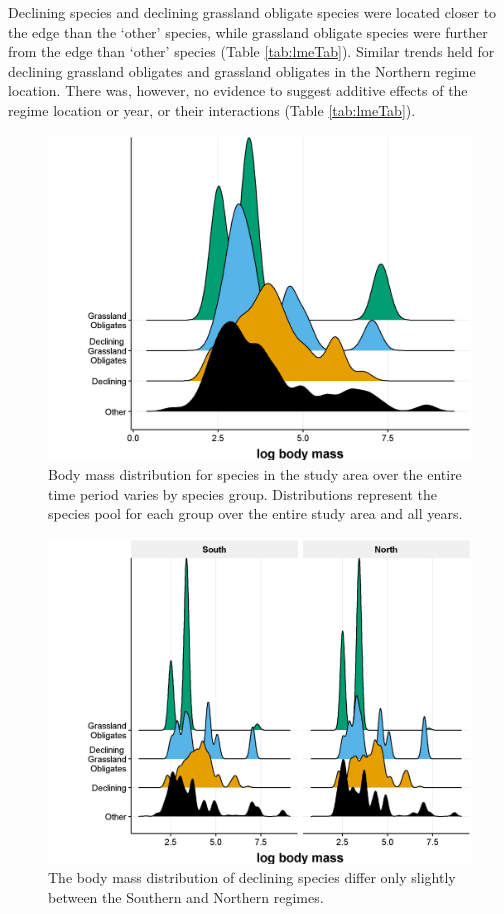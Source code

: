 \documentclass[print]{nuthesis}
\begin{document}
Declining species and declining grassland obligate species were located closer to the edge than the `other' species, while grassland obligate species were further from the edge than `other' species (Table \ref{tab:lmeTab}). Similar trends held for declining grassland obligates and grassland obligates in the Northern regime location. There was, however, no evidence to suggest additive effects of the regime location or year, or their interactions (Table \ref{tab:lmeTab}).
\begin{figure}
\includegraphics[width=0.85\linewidth]{.//chapterFiles/discontinuityAnalysis/figsCalledInDiss/bmDistPerSppGroup} \caption{Body mass distribution for species in the study area over the entire time period varies by species group. Distributions represent the species pool for each group over the entire study area and all years.}\label{fig:bmDistPerSppGroup}
\end{figure}
\begin{figure}
\includegraphics[width=0.85\linewidth]{.//chapterFiles/discontinuityAnalysis/figsCalledInDiss/bmDistPerSppGroup-byRegime} \caption{The body mass distribution of declining species differ only slightly between the Southern and Northern regimes.}\label{fig:bmDistPerSppGroup-byRegime}
\end{figure}
\end{document}
